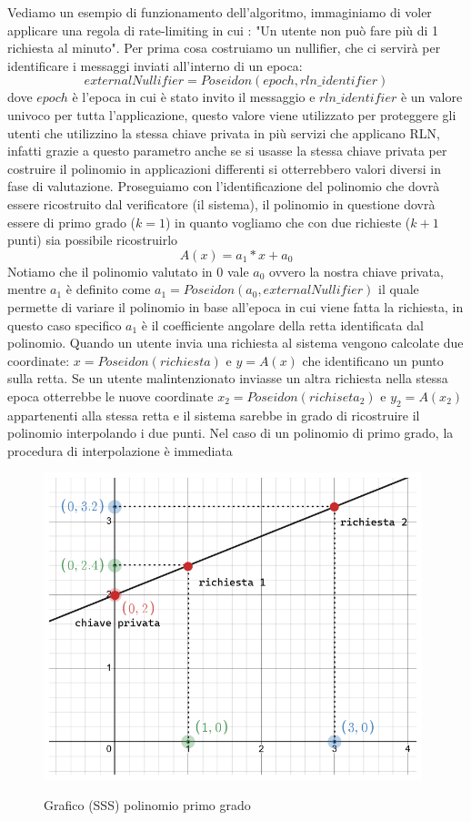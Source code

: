 Vediamo un esempio di funzionamento dell'algoritmo, immaginiamo di voler applicare una regola di rate-limiting in cui :
"Un utente non può fare più di 1 richiesta al minuto". Per prima cosa costruiamo un nullifier, che ci servirà per
identificare i messaggi inviati all'interno di un epoca:
$$externalNullifier = Poseidon(epoch,rln\_identifier)$$ dove $epoch$ è l'epoca in cui è stato invito il messaggio e
$rln\_identifier$ è un valore univoco per tutta l'applicazione, questo valore viene utilizzato per proteggere gli utenti
che utilizzino la stessa chiave privata in più servizi che applicano RLN, infatti grazie a questo parametro anche se si
usasse la stessa chiave privata per costruire il polinomio in applicazioni differenti si otterrebbero valori diversi in fase di valutazione.
Proseguiamo con l'identificazione del polinomio che dovrà essere ricostruito dal verificatore (il sistema), il polinomio
in questione dovrà essere di primo grado ($k=1$) in quanto vogliamo che con due richieste ($k+1$ punti) sia possibile
ricostruirlo
$$ A(x) = a_1 * x + a_0$$ Notiamo che il polinomio valutato in 0 vale $a_0$ ovvero la nostra chiave privata, mentre
$a_1$ è definito come $a_1 = Poseidon(a_0, externalNullifier)$ il quale permette di variare il polinomio in base all'epoca in
cui viene fatta la richiesta, in questo caso specifico $a_1$ è il coefficiente angolare della retta identificata dal
polinomio. Quando un utente invia una richiesta al sistema vengono calcolate due coordinate: $x = Poseidon(richiesta)$ e
$y=A(x)$ che identificano un punto sulla retta. Se un utente malintenzionato inviasse un altra richiesta nella stessa epoca
otterrebbe le nuove coordinate $x_2 = Poseidon(richiseta_2)$ e $y_2=A(x_2)$ appartenenti alla stessa retta e il sistema
sarebbe in grado di ricostruire il polinomio interpolando i due punti. Nel caso di un polinomio di primo grado, la
procedura di interpolazione è immediata
\begin{figure}[H]
    \centering
    \includegraphics[width=11cm]{./chapters/2.rln-protocol/images/6.a_0_interpolation.png}
    \label{fig:a_0_interpolation}
    \captionsetup{justification=centering}
    \caption{Grafico (SSS) polinomio primo grado}
\end{figure}